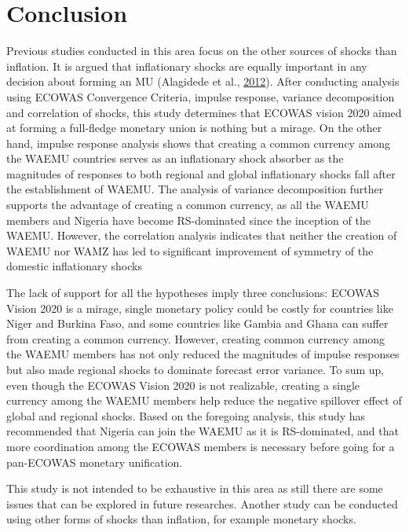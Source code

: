 \documentclass[]{article}
\begin{document}
\hypertarget{conclusion}{%
\section{Conclusion}\label{conclusion}}

Previous studies conducted in this area focus on the other sources of shocks than inflation. It is argued that inflationary shocks are equally important in any decision about forming an MU (Alagidede et al., \protect\hyperlink{ref-ALAGIDEDE2012460}{2012}). After conducting analysis using ECOWAS Convergence Criteria, impulse response, variance decomposition and correlation of shocks, this study determines that ECOWAS vision 2020 aimed at forming a full-fledge monetary union is nothing but a mirage. On the other hand, impulse response analysis shows that creating a common currency among the WAEMU countries serves as an inflationary shock absorber as the magnitudes of responses to both regional and global inflationary shocks fall after the establishment of WAEMU. The analysis of variance decomposition further supports the advantage of creating a common currency, as all the WAEMU members and Nigeria have become RS-dominated since the inception of the WAEMU. However, the correlation analysis indicates that neither the creation of WAEMU nor WAMZ has led to significant improvement of symmetry of the domestic inflationary shocks

The lack of support for all the hypotheses imply three conclusions: ECOWAS Vision 2020 is a mirage, single monetary policy could be costly for countries like Niger and Burkina Faso, and some countries like Gambia and Ghana can suffer from creating a common currency. However, creating common currency among the WAEMU members has not only reduced the magnitudes of impulse responses but also made regional shocks to dominate forecast error variance. To sum up, even though the ECOWAS Vision 2020 is not realizable, creating a single currency among the WAEMU members help reduce the negative spillover effect of global and regional shocks. Based on the foregoing analysis, this study has recommended that Nigeria can join the WAEMU as it is RS-dominated, and that more coordination among the ECOWAS members is necessary before going for a pan-ECOWAS monetary unification.

This study is not intended to be exhaustive in this area as still there are some issues that can be explored in future researches. Another study can be conducted using other forms of shocks than inflation, for example monetary shocks.
\end{document}
